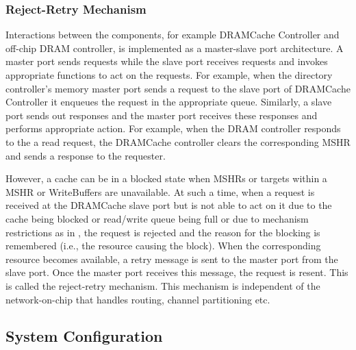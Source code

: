 \subsubsection{Reject-Retry Mechanism} Interactions between the components, for example DRAMCache Controller and off-chip DRAM controller, is implemented as a master-slave port architecture. A master port sends requests while the slave port receives requests and invokes appropriate functions to act on the requests. For example, when the directory controller's memory master port sends a request to the slave port of DRAMCache Controller it enqueues the request in the appropriate queue. Similarly, a slave port sends out responses and the master port receives these responses and performs appropriate action. For example, when the DRAM controller responds to the a read request, the DRAMCache controller clears the corresponding MSHR and sends a response to the requester.
\par However, a cache can be in a blocked state when MSHRs or targets within a MSHR or WriteBuffers are unavailable. At such a time, when a request is received at the DRAMCache slave port but is not able to act on it due to the cache being blocked or read/write queue being full or due to mechanism restrictions as in \prioname, the request is rejected and the reason for the blocking is remembered (i.e., the resource causing the block). When the corresponding resource becomes available, a retry message is sent to the master port from the slave port. Once the master port receives this message, the request is resent. This is called the reject-retry mechanism. This mechanism is independent of the network-on-chip that handles routing, channel partitioning etc.

\subsection{System Configuration} 

